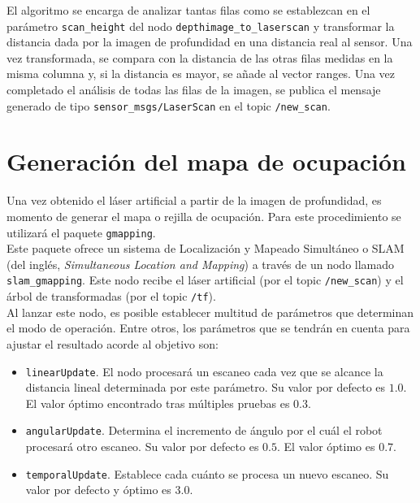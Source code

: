 El algoritmo se encarga de analizar tantas filas como se establezcan en el parámetro \texttt{scan\_height} del nodo \texttt{depthimage\_to\_laserscan} y transformar la distancia dada por la imagen de profundidad en una distancia real al sensor. Una vez transformada, se compara con la distancia de las otras filas medidas en la misma columna y, si la distancia es mayor, se añade al vector ranges. Una vez completado el análisis de todas las filas de la imagen, se publica el mensaje generado de tipo \texttt{sensor\_msgs/LaserScan} en el topic \texttt{/new\_scan}.\\

\section{Generación del mapa de ocupación} \label{mapa_ocup}

Una vez obtenido el láser artificial a partir de la imagen de profundidad, es momento de generar el mapa o rejilla de ocupación. Para este procedimiento se utilizará el paquete \texttt{gmapping}.\\

Este paquete ofrece un sistema de Localización y Mapeado Simultáneo o SLAM (del inglés, \textit{Simultaneous Location and Mapping}) a través de un nodo llamado \texttt{slam\_gmapping}. Este nodo recibe el láser artificial (por el topic \texttt{/new\_scan}) y el árbol de transformadas (por el topic \texttt{/tf}).\\

Al lanzar este nodo, es posible establecer multitud de parámetros que determinan el modo de operación. Entre otros, los parámetros que se tendrán en cuenta para ajustar el resultado acorde al objetivo son:

\begin{itemize}

	\item \texttt{linearUpdate}. El nodo procesará un escaneo cada vez que se alcance la distancia lineal determinada por este parámetro. Su valor por defecto es $1.0$. El valor óptimo encontrado tras múltiples pruebas es $0.3$.
	\item \texttt{angularUpdate}. Determina el incremento de ángulo por el cuál el robot procesará otro escaneo. Su valor por defecto es $0.5$. El valor óptimo es $0.7$.
	\item \texttt{temporalUpdate}. Establece cada cuánto se procesa un nuevo escaneo. Su valor por defecto y óptimo es $3.0$.

\end{itemize}

